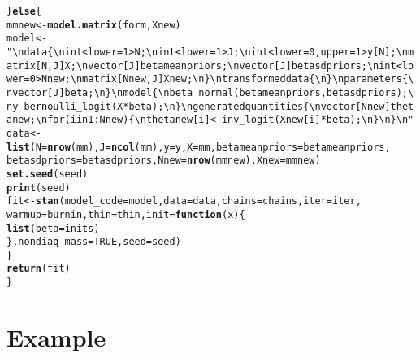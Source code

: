 \documentclass{article}\usepackage[]{graphicx}\usepackage[]{color}
\makeatletter
\newcommand{\hlnum}[1]{\textcolor[rgb]{0.686,0.059,0.569}{#1}}%
\newcommand{\hlstr}[1]{\textcolor[rgb]{0.192,0.494,0.8}{#1}}%
\newcommand{\hlstd}[1]{\textcolor[rgb]{0.345,0.345,0.345}{#1}}%
\newcommand{\hlkwa}[1]{\textcolor[rgb]{0.161,0.373,0.58}{\textbf{#1}}}%
\newcommand{\hlkwb}[1]{\textcolor[rgb]{0.69,0.353,0.396}{#1}}%
\newcommand{\hlkwc}[1]{\textcolor[rgb]{0.333,0.667,0.333}{#1}}%
\newcommand{\hlkwd}[1]{\textcolor[rgb]{0.737,0.353,0.396}{\textbf{#1}}}%
\newenvironment{kframe}{%
 \def\at@end@of@kframe{}%
 \ifinner\ifhmode%
  \def\at@end@of@kframe{\end{minipage}}%
  \begin{minipage}{\columnwidth}%
 \fi\fi%
 \def\FrameCommand##1{\hskip\@totalleftmargin \hskip-\fboxsep
 \colorbox{shadecolor}{##1}\hskip-\fboxsep
     \hskip-\linewidth \hskip-\@totalleftmargin \hskip\columnwidth}%
 \MakeFramed {\advance\hsize-\width
   \@totalleftmargin\z@ \linewidth\hsize
   \@setminipage}}%
 {\par\unskip\endMakeFramed%
 \at@end@of@kframe}
\newenvironment{knitrout}{}{} %
\makeatother
\begin{document}
\begin{knitrout}
\begin{kframe}
\begin{alltt}
    \hlstd{\}} \hlkwa{else} \hlstd{\{}
        \hlstd{mmnew} \hlkwb{<-} \hlkwd{model.matrix}\hlstd{(form, Xnew)}
        \hlstd{model} \hlkwb{<-} \hlstr{"\textbackslash{}n  data \{\textbackslash{}n    int<lower=1>               N;\textbackslash{}n    int<lower=1>               J;\textbackslash{}n    int<lower=0, upper=1>   y[N];\textbackslash{}n    matrix[N,J]                X;\textbackslash{}n    vector[J]     betameanpriors;\textbackslash{}n    vector[J]       betasdpriors;\textbackslash{}n    int<lower=0>            Nnew;\textbackslash{}n    matrix[Nnew,J]          Xnew;\textbackslash{}n  \}\textbackslash{}n  transformed data \{\textbackslash{}n  \}\textbackslash{}n  parameters \{\textbackslash{}n    vector[J] beta;\textbackslash{}n  \}\textbackslash{}n  model \{\textbackslash{}n    beta ~ normal(betameanpriors,betasdpriors);\textbackslash{}n    y ~ bernoulli_logit( X*beta );\textbackslash{}n  \}\textbackslash{}n  generated quantities \{\textbackslash{}n    vector[Nnew] thetanew;\textbackslash{}n    for( i in 1:Nnew ) \{\textbackslash{}n      thetanew[i] <- inv_logit( Xnew[i] * beta );\textbackslash{}n    \}\textbackslash{}n  \}\textbackslash{}n  "}
        \hlstd{data} \hlkwb{<-} \hlkwd{list}\hlstd{(}\hlkwc{N} \hlstd{=} \hlkwd{nrow}\hlstd{(mm),} \hlkwc{J} \hlstd{=} \hlkwd{ncol}\hlstd{(mm),} \hlkwc{y} \hlstd{= y,} \hlkwc{X} \hlstd{= mm,} \hlkwc{betameanpriors} \hlstd{= betameanpriors,}
            \hlkwc{betasdpriors} \hlstd{= betasdpriors,} \hlkwc{Nnew} \hlstd{=} \hlkwd{nrow}\hlstd{(mmnew),} \hlkwc{Xnew} \hlstd{= mmnew)}
        \hlkwd{set.seed}\hlstd{(seed)}
        \hlkwd{print}\hlstd{(seed)}
        \hlstd{fit} \hlkwb{<-} \hlkwd{stan}\hlstd{(}\hlkwc{model_code} \hlstd{= model,} \hlkwc{data} \hlstd{= data,} \hlkwc{chains} \hlstd{= chains,} \hlkwc{iter} \hlstd{= iter,}
            \hlkwc{warmup} \hlstd{= burnin,} \hlkwc{thin} \hlstd{= thin,} \hlkwc{init} \hlstd{=} \hlkwa{function}\hlstd{(}\hlkwc{x}\hlstd{) \{}
                \hlkwd{list}\hlstd{(}\hlkwc{beta} \hlstd{= inits)}
            \hlstd{\},} \hlkwc{nondiag_mass} \hlstd{=} \hlnum{TRUE}\hlstd{,} \hlkwc{seed} \hlstd{= seed)}
    \hlstd{\}}
    \hlkwd{return}\hlstd{(fit)}
\hlstd{\}}
\end{alltt}
\end{kframe}
\end{knitrout}


\section{Example}
\end{document}
